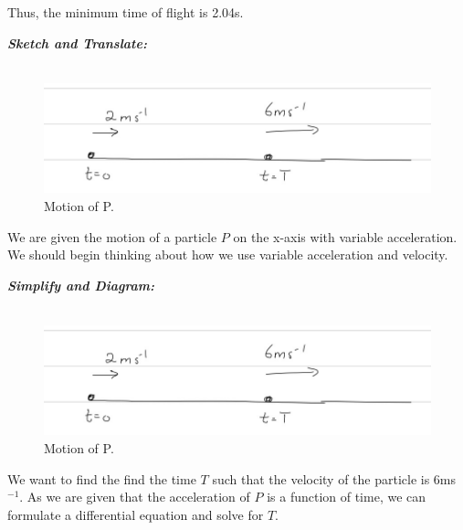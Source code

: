 \begin{subquestions}
\begin{subsubquestions}
Thus, the minimum time of flight is 2.04s.

\end{subsubquestions}
	

\subquestion

\textbf{\textit{Sketch and Translate:}} \\ \\
\begin{figure}[H]
	\begin{center}
		\includegraphics[scale=0.25]{../2014/figures/2014q6-3}
		\caption{\label{2014:q6:Sketch3} Motion of P.}
	\end{center}
\end{figure}
We are given the motion of a particle $P$ on the x-axis with variable acceleration. We should begin thinking about how we use variable acceleration and velocity.




\textbf{\textit{Simplify and Diagram:}} \\ \\
\begin{figure}[H]
	\begin{center}
		\includegraphics[scale=0.25]{../2014/figures/2014q6-3}
		\caption{\label{2014:q6:Diagram3} Motion of P.}
	\end{center}
\end{figure}
We want to find the find the time $T$ such that the velocity of the particle is 6ms$^{-1}$. As we are given that the acceleration of $P$ is a function of time, we can formulate a differential equation and solve for $T$.





\end{subquestions}

